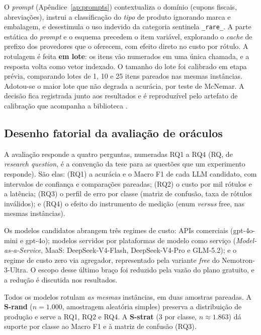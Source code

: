 O \textit{prompt} (Apêndice~\ref{ap:prompts}) contextualiza o domínio (cupons
fiscais, abreviações), instrui a classificação do \emph{tipo} de produto ignorando
marca e embalagem, e desestimula o uso indevido da categoria sentinela
\texttt{\_rare\_}. A parte estática do \textit{prompt} e o esquema precedem o item
variável, explorando o \textit{cache} de prefixo dos provedores que o oferecem,
com efeito direto no custo por rótulo. A rotulagem é feita \textbf{em lote}: os itens vão
numerados em uma única chamada, e a resposta volta como vetor indexado. O
tamanho do lote foi calibrado em etapa prévia, comparando lotes de 1, 10 e 25
itens pareados nas mesmas instâncias. Adotou-se o maior lote que não degrada a
acurácia, por teste de McNemar. A decisão fica registrada junto aos resultados
e é reproduzível pelo artefato de calibração que acompanha a biblioteca \cite{DaruActiveLearning}.

\subsection{Desenho fatorial da avaliação de oráculos}
\label{sec:metodo-oraculo-desenho}

A avaliação responde a quatro perguntas, numeradas RQ1 a RQ4 (RQ, de
\textit{research question}, é a convenção da tese para as questões que um
experimento responde). São elas: (RQ1) a acurácia e o Macro F1 de cada
LLM candidato, com intervalos de confiança e comparações pareadas; (RQ2) o
custo por mil rótulos e a latência; (RQ3) o perfil de erro por classe (matriz
de confusão, taxa de rótulos inválidos); e (RQ4) o efeito do instrumento de
medição (enum \textit{versus} free, nas mesmas instâncias).

Os modelos candidatos abrangem três regimes de custo: APIs comerciais
(gpt-4o-mini e gpt-4o); modelos servidos por plataformas de modelo como serviço
(\textit{Model-as-a-Service}, MaaS: DeepSeek-V4-Flash, DeepSeek-V4-Pro e
GLM-5.2); e o regime de custo zero via agregador, representado pela variante
\textit{free} do Nemotron-3-Ultra. O escopo desse último braço foi reduzido
pela vazão do plano gratuito, e a redução é discutida nos resultados.

Todos os modelos rotulam \emph{as mesmas} instâncias, em duas amostras
pareadas. A \textbf{S-rand} ($n=1.000$, amostragem aleatória simples) preserva
a distribuição de produção e serve a RQ1, RQ2 e RQ4. A \textbf{S-strat}
(3 por classe, $n \approx 1.863$) dá suporte por classe ao Macro F1 e à matriz
de confusão (RQ3).

